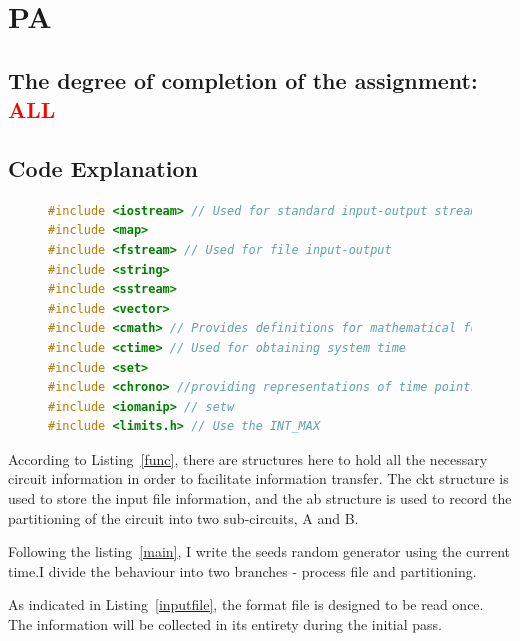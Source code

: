 \documentclass{article}
\begin{document}
\section{PA}

\subsection{The degree of completion of the assignment: \textcolor{red}{ALL}}

\subsection{Code Explanation}

\begin{figure}[H]
\begin{lstlisting}[language = {c++},caption={Preprocessors}, label={library}]
#include <iostream> // Used for standard input-output streams
#include <map>
#include <fstream> // Used for file input-output
#include <string>
#include <sstream>
#include <vector>
#include <cmath> // Provides definitions for mathematical functions
#include <ctime> // Used for obtaining system time
#include <set>
#include <chrono> //providing representations of time points and durations
#include <iomanip> // setw
#include <limits.h> // Use the INT_MAX
\end{lstlisting}
\end{figure}
\vspace*{-1em}

According to \noindent Listing~\ref{func}, there are structures here to hold all the necessary circuit information in order to facilitate information transfer.
The ckt structure is used to store the input file information, and the ab structure is used to record the partitioning of the circuit into two sub-circuits, A and B.



Following the \noindent listing~\ref{main}, I write the seeds random generator using the current time.I divide the behaviour into two branches - process file and partitioning.
 


As indicated in Listing~\ref{inputfile}, the format file is designed to be read once. The information will be collected in its entirety during the initial pass. 
\end{document}
